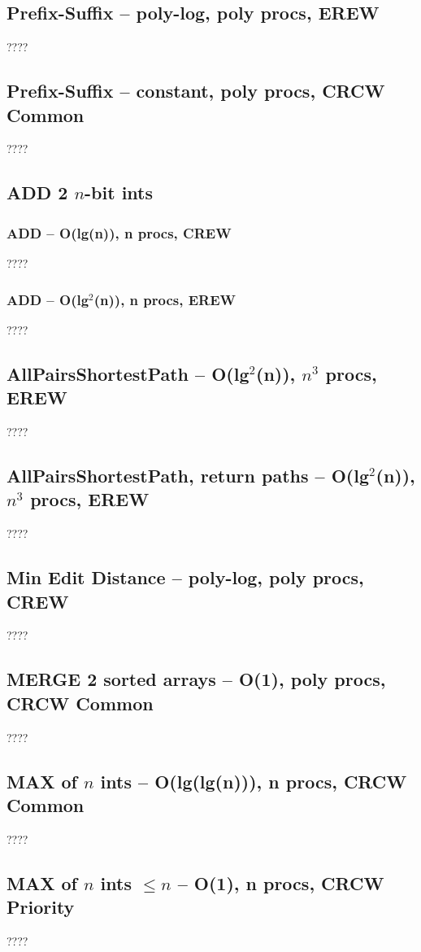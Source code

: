 \documentclass[12pt]{article}
\begin{document}
\subsection{Prefix-Suffix -- poly-log, poly procs, EREW}
????


\subsection{Prefix-Suffix -- constant, poly procs, CRCW Common}
????


\subsection{ADD 2 $n$-bit ints}
\subsubsection{ADD -- O(lg(n)), n procs, CREW}
????
\subsubsection{ADD -- O(lg$^2$(n)), n procs, EREW}
????


\subsection{AllPairsShortestPath -- O(lg$^2$(n)), $n^3$ procs, EREW}
????

\subsection{AllPairsShortestPath, return paths -- O(lg$^2$(n)), $n^3$ procs, EREW}
????


\subsection{Min Edit Distance -- poly-log, poly procs, CREW}
????


\subsection{MERGE 2 sorted arrays -- O(1), poly procs, CRCW Common}
????


\subsection{MAX of $n$ ints -- O(lg(lg(n))), n procs, CRCW Common}
????

\subsection{MAX of $n$ ints $\leq n$ -- O(1), n procs, CRCW Priority}
????
\end{document}
